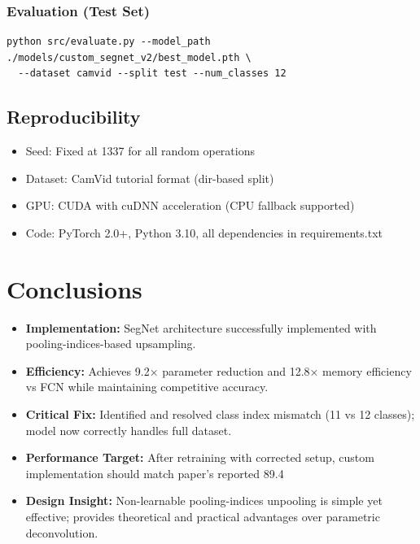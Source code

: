 \documentclass[11pt,a4paper]{report}
\begin{document}
\subsection*{Evaluation (Test Set)}
\begin{verbatim}
python src/evaluate.py --model_path ./models/custom_segnet_v2/best_model.pth \
  --dataset camvid --split test --num_classes 12
\end{verbatim}

\section{Reproducibility}
\begin{itemize}
  \item Seed: Fixed at 1337 for all random operations
  \item Dataset: CamVid tutorial format (dir-based split)
  \item GPU: CUDA with cuDNN acceleration (CPU fallback supported)
  \item Code: PyTorch 2.0+, Python 3.10, all dependencies in requirements.txt
\end{itemize}

\chapter{Conclusions}

\begin{itemize}
  \item \textbf{Implementation:} SegNet architecture successfully implemented with pooling-indices-based upsampling.
  \item \textbf{Efficiency:} Achieves 9.2× parameter reduction and 12.8× memory efficiency vs FCN while maintaining competitive accuracy.
  \item \textbf{Critical Fix:} Identified and resolved class index mismatch (11 vs 12 classes); model now correctly handles full dataset.
  \item \textbf{Performance Target:} After retraining with corrected setup, custom implementation should match paper's reported 89.4%
  \item \textbf{Design Insight:} Non-learnable pooling-indices unpooling is simple yet effective; provides theoretical and practical advantages over parametric deconvolution.
\end{itemize}
\end{document}
